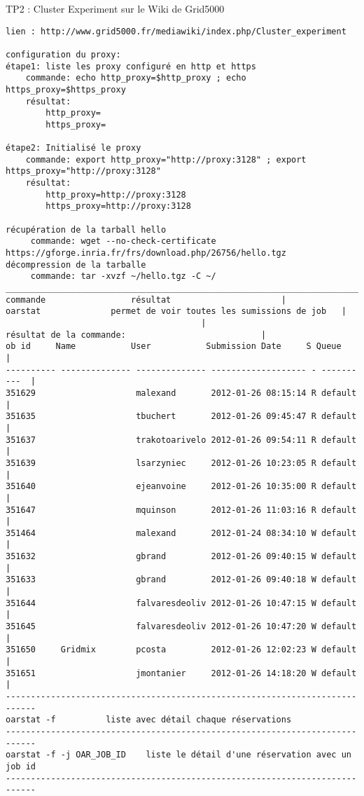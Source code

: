 TP2 : Cluster Experiment sur le Wiki de Grid5000
\begin{lstlisting}
lien : http://www.grid5000.fr/mediawiki/index.php/Cluster_experiment

configuration du proxy:
étape1: liste les proxy configuré en http et https
	commande: echo http_proxy=$http_proxy ; echo https_proxy=$https_proxy
	résultat:
		http_proxy=
		https_proxy=

étape2: Initialisé le proxy
	commande: export http_proxy="http://proxy:3128" ; export https_proxy="http://proxy:3128"
	résultat:
		http_proxy=http://proxy:3128
		https_proxy=http://proxy:3128

récupération de la tarball hello
	 commande: wget --no-check-certificate https://gforge.inria.fr/frs/download.php/26756/hello.tgz
décompression de la tarballe
	 commande: tar -xvzf ~/hello.tgz -C ~/
___________________________________________________________________________
commande 	       	     résultat					   |
oarstat			     permet de voir toutes les sumissions de job   |
									   |
résultat de la commande:						   |
ob id     Name           User           Submission Date     S Queue	   |
---------- -------------- -------------- ------------------- - ----------  |
351629                    malexand       2012-01-26 08:15:14 R default     |
351635                    tbuchert       2012-01-26 09:45:47 R default     |
351637                    trakotoarivelo 2012-01-26 09:54:11 R default     |
351639                    lsarzyniec     2012-01-26 10:23:05 R default     |
351640                    ejeanvoine     2012-01-26 10:35:00 R default     |
351647                    mquinson       2012-01-26 11:03:16 R default     |
351464                    malexand       2012-01-24 08:34:10 W default     |
351632                    gbrand         2012-01-26 09:40:15 W default     |
351633                    gbrand         2012-01-26 09:40:18 W default     |
351644                    falvaresdeoliv 2012-01-26 10:47:15 W default     |
351645                    falvaresdeoliv 2012-01-26 10:47:20 W default     |
351650     Gridmix        pcosta         2012-01-26 12:02:23 W default     |
351651                    jmontanier     2012-01-26 14:18:20 W default     |
----------------------------------------------------------------------------
oarstat -f			liste avec détail chaque réservations
----------------------------------------------------------------------------
oarstat -f -j OAR_JOB_ID	liste le détail d'une réservation avec un job id
----------------------------------------------------------------------------

\end{lstlisting}
